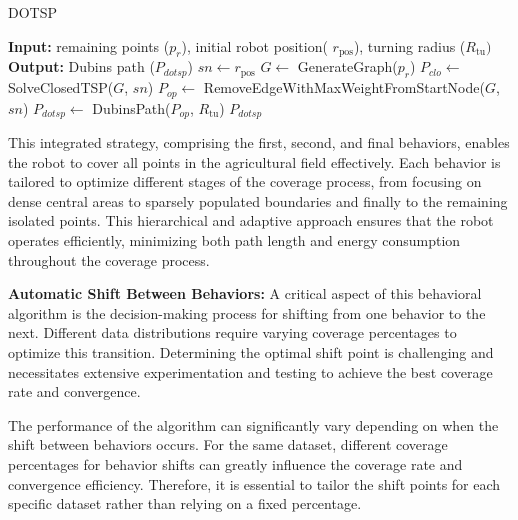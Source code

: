 \begin{algorithm}[H]
    \caption{DOTSP}
    \label{alg:dotsp_path}
    \begin{algorithmic}[1]
    \Statex \textbf{Input:} remaining points ($p_r$), initial robot position( $r_{\text{pos}}$), turning radius ($R_{\text{tu}})$
    \Statex \textbf{Output:} Dubins path ($P_{dotsp}$)
    \newline
    \State $sn \leftarrow r_{\text{pos}}$
    \State $G \leftarrow$ GenerateGraph($p_r$)
    \State $P_{clo} \leftarrow$ SolveClosedTSP($G$, $sn$)
    \State $P_{op} \leftarrow$ RemoveEdgeWithMaxWeightFromStartNode($G$, $sn$)
    \State $P_{dotsp} \leftarrow$ DubinsPath($P_{op}$, $R_{\text{tu}}$)
    \State \Return $P_{dotsp}$
    \end{algorithmic}
    \end{algorithm}

This integrated strategy, comprising the first, second, and final behaviors, enables the robot to cover all points in the agricultural field effectively. Each behavior is tailored to optimize different stages of the coverage process, from focusing on dense central areas to sparsely populated boundaries and finally to the remaining isolated points. This hierarchical and adaptive approach ensures that the robot operates efficiently, minimizing both path length and energy consumption throughout the coverage process.


\vspace*{6mm}   

\textbf{Automatic Shift Between Behaviors: }
A critical aspect of this behavioral algorithm is the decision-making process for shifting from one behavior to the next. Different data distributions require varying coverage percentages to optimize this transition. Determining the optimal shift point is challenging and necessitates extensive experimentation and testing to achieve the best coverage rate and convergence.

\vspace*{6mm}   

The performance of the algorithm can significantly vary depending on when the shift between behaviors occurs. For the same dataset, different coverage percentages for behavior shifts can greatly influence the coverage rate and convergence efficiency. Therefore, it is essential to tailor the shift points for each specific dataset rather than relying on a fixed percentage.

\vspace*{6mm}   

